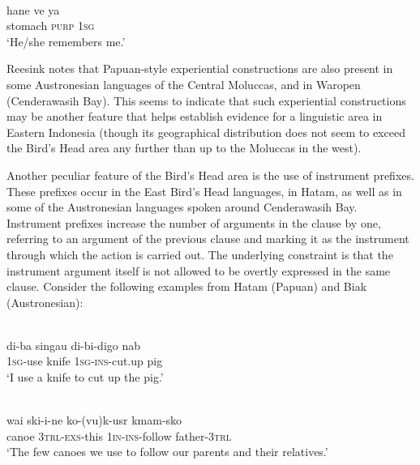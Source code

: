 \ea 
{}\\
\gll hane ve ya \\
stomach \textsc{purp} \textsc{1}\textsc{sg} \\
\glft `He/she remembers me.'\\ 
\z

Reesink notes that Papuan-style experiential constructions are also present in some Austronesian languages of the Central Moluccas, and in Waropen (Cenderawasih Bay). This seems to indicate that such experiential constructions may be another feature that helps establish evidence for a linguistic area in Eastern Indonesia (though its geographical distribution does not seem to exceed the Bird's Head area any further than up to the Moluccas in the west).

Another peculiar feature of the Bird's Head area is the use of instrument prefixes. These prefixes occur in the East Bird's Head languages, in Hatam, as well as in some of the Austronesian languages spoken around Cenderawasih Bay. Instrument prefixes increase the number of arguments in the clause by one, referring to an argument of the previous clause and marking it as the instrument through which the action is carried out. The underlying constraint is that the instrument argument itself is not allowed to be overtly expressed in the same clause. Consider the following examples from Hatam (Papuan) and Biak (Austronesian):

\ea \label{Hatam_ins}
\\
\gll di-ba singau di-bi-digo nab \\
\textsc{1}\textsc{sg}-use knife \textsc{1}\textsc{sg}-\textsc{ins}-cut.up pig \\
\glft `I use a knife to cut up the pig.'\\ 
\z

\ea \label{Biak_ins}
\\
\gll wai ski-i-ne ko-(vu)k-usr kmam-sko \\
canoe \textsc{3}\textsc{trl}-\textsc{exs}-this \textsc{1}\textsc{in}-\textsc{ins}-follow father-\textsc{3}\textsc{trl} \\
\glft `The few canoes we use to follow our parents and their relatives.'\\ 
\z

